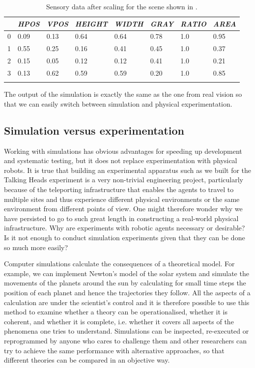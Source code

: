 \begin{table}
\begin{center}
\begin{tabular}{  l   l   l   l   l   l   l   l  }
\lsptoprule
& {\itshape HPOS} & {\itshape VPOS} & {\itshape HEIGHT} & {\itshape WIDTH} & {\itshape GRAY} & {\itshape RATIO}  & {\itshape AREA} \\ \midrule
0 & 0.09 & 0.13 &  0.64 &  0.64 &  0.78 &  1.0 & 0.95 \\ 
1 & 0.55 & 0.25 & 0.16 & 0.41 & 0.45 & 1.0 & 0.37 \\ 
2 & 0.15 & 0.05 & 0.12 & 0.12 & 0.41 & 1.0 & 0.21 \\ 
3 & 0.13 & 0.62 & 0.59 & 0.59 & 0.20 & 1.0 & 0.85 \\ 
\lspbottomrule
\end{tabular}
\end{center}
\caption{\label{tab:t-geomscaled} Sensory data after scaling for the scene shown in .}
\end{table}

The output of the simulation is exactly the same as the one from real vision 
so that we can easily switch between simulation 
and physical experimentation. 

\subsection{Simulation versus experimentation}

Working with simulations has obvious advantages for 
speeding up development and systematic testing, 
but it does not replace experimentation with 
physical robots. It is true that 
building an experimental apparatus such as we built
for the Talking Heads experiment is a very 
non-trivial engineering project, particularly because 
of the teleporting infrastructure that enables the agents 
to travel to multiple sites and thus 
experience different physical environments or the same 
environment from different points of view. 
One might therefore wonder why we have persisted
to go to such great length in constructing
a real-world physical infrastructure. Why are
experiments with robotic agents necessary or 
desirable? Is it not enough to conduct simulation
experiments given that they can be done so much 
more easily? 

Computer simulations calculate the consequences of a
theoretical model. For example, we can implement Newton's
model of the solar system and simulate the movements
of the planets around the sun by calculating for 
small time steps the position of each planet and hence
the trajectories they follow. All the aspects of 
a calculation are under the scientist's control and it 
is therefore possible to use this method to examine whether a theory can 
be operationalised, whether it is coherent, and whether 
it is complete, i.e. whether it covers all 
aspects of the phenomena one tries to understand. 
Simulations can be inspected, re-executed
or reprogrammed by anyone who cares to challenge them and
other researchers can try to achieve the
same performance with alternative approaches, so that 
different theories can be compared in an objective way. 

